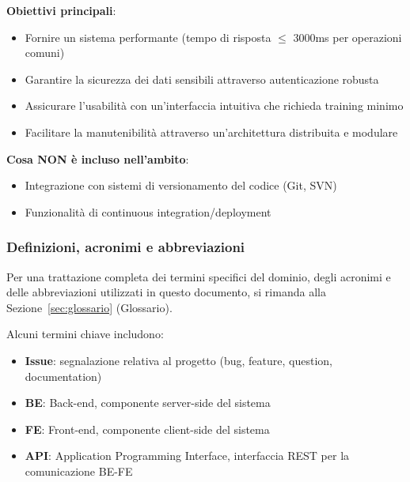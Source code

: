 \noindent\textbf{Obiettivi principali}:

\begin{itemize}[leftmargin=1.1em]
\item Fornire un sistema performante (tempo di risposta $\leq$ 3000ms per operazioni comuni)
\item Garantire la sicurezza dei dati sensibili attraverso autenticazione robusta
\item Assicurare l'usabilità con un'interfaccia intuitiva che richieda training minimo
\item Facilitare la manutenibilità attraverso un'architettura distribuita e modulare
\end{itemize}

\noindent\textbf{Cosa NON è incluso nell'ambito}:

\begin{itemize}[leftmargin=1.1em]
\item Integrazione con sistemi di versionamento del codice (Git, SVN)
\item Funzionalità di continuous integration/deployment
\end{itemize}

\subsubsection{Definizioni, acronimi e abbreviazioni}
\label{subsec:definizioni}

Per una trattazione completa dei termini specifici del dominio, degli acronimi e delle abbreviazioni utilizzati in questo documento, si rimanda alla Sezione~\ref{sec:glossario} (Glossario).

Alcuni termini chiave includono:

\begin{itemize}[leftmargin=1.1em]
\item \textbf{Issue}: segnalazione relativa al progetto (bug, feature, question, documentation)
\item \textbf{BE}: Back-end, componente server-side del sistema
\item \textbf{FE}: Front-end, componente client-side del sistema
\item \textbf{API}: Application Programming Interface, interfaccia REST per la comunicazione BE-FE
\end{itemize}

